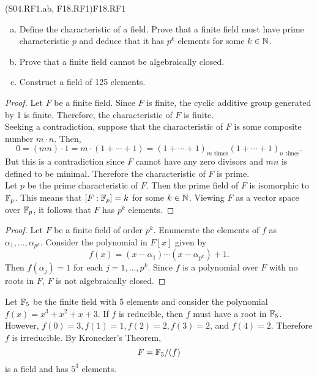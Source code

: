 \documentclass[../AlgebraQualSolutions.tex]{subfiles}
\begin{document}
\begin{prob}{(S04.RF1.ab, F18.RF1)}{F18.RF1}
	\begin{enumerate}[(a)]
		\item Define the characteristic of a field. Prove that a finite field must have prime characteristic $p$ and deduce that it has $p^k$ elements for some $k \in \mathbb{N}$.
		\item Prove  that a finite field cannot be algebraically closed.
		\item Construct a field of 125 elements.
	\end{enumerate}
\end{prob}

\begin{proof}
	Let $F$ be a finite field. Since $F$ is finite, the cyclic additive  group generated by 1 is finite. Therefore, the characteristic of $F$ is finite.\\
	
	Seeking a contradiction, suppose that the characteristic of $F$ is some composite number $m\cdot n$. Then,
		\[0 = (mn)\cdot 1 = m\cdot (1 + \cdots + 1) = (1 + \cdots + 1)_{\textrm{$m$ times}} (1 + \cdots + 1)_{\textrm{$n$ times}}.\]
	But this is a contradiction since $F$ cannot have any zero divisors and $mn$ is defined to be minimal. Therefore the characteristic of $F$ is prime.\\

	Let $p$ be the prime characteristic of $F$. Then the prime field of $F$ is isomorphic to $\mathbb{F}_p$. This means that $[F: \mathbb{F}_p] = k$ for some $k \in \mathbb{N}$. Viewing $F$ as a vector space over $\mathbb{F}_p$, it follows that $F$ has $p^k$ elements.
\end{proof}

\begin{proof}
	Let $F$ be a  finite field of order $p^k$. Enumerate the elements of $f$ as $\alpha_1,\ldots, \alpha_{p^k}$. Consider the polynomial in $F[x]$ given by 
		\[f(x) = (x-\alpha_1)\cdots (x-\alpha_{p^k}) + 1.\]
	Then $f(\alpha_j) = 1$ for each $j = 1,\ldots,p^k$. Since $f$ is a polynomial over $F$ with no roots in $F$, $F$ is not algebraically closed.
\end{proof}

\begin{solution}
	Let $\mathbb{F}_5$ be the finite field with 5 elements and consider the polynomial $f(x) = x^3 + x^2 + x + 3$. If $f$ is reducible, then $f$ must have a root in $\mathbb{F}_5$. However, $f(0) = 3, f(1) = 1, f(2) = 2, f(3) = 2$, and $f(4) = 2$. Therefore $f$ is irreducible. By Kronecker's Theorem,
		\[F = \mathbb{F}_5/(f)\]
	is a field and has $5^3$ elements.
\end{solution}
\end{document}

